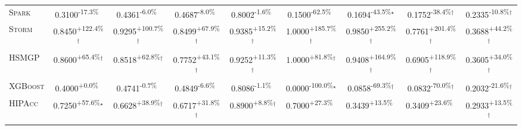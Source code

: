 \begin{table}[htbp]
\begin{tabular}{l|cccc|cccc}
\textsc{Spark} & \cellcolor{red!30}0.3100\textsuperscript{-17.3\%}$^{\,\,\,}$ & \cellcolor{red!30}0.4361\textsuperscript{-6.0\%}$^{\,\,\,}$ & \cellcolor{red!30}0.4687\textsuperscript{-8.0\%}$^{\,\,\,}$ & \cellcolor{red!30}0.8002\textsuperscript{-1.6\%}$^{\,\,\,}$ & \cellcolor{red!30}0.1500\textsuperscript{-62.5\%}$^{\,\,\,}$ & \cellcolor{red!30}0.1694\textsuperscript{-43.5\%}$^\star$ & \cellcolor{red!30}0.1752\textsuperscript{-38.4\%}$^\dagger$ & \cellcolor{red!30}0.2335\textsuperscript{-10.8\%}$^\dagger$ \\
\textsc{Storm} & \cellcolor{green!30}0.8450\textsuperscript{+122.4\%}$^\dagger$ & \cellcolor{green!30}0.9295\textsuperscript{+100.7\%}$^\dagger$ & \cellcolor{green!30}0.8499\textsuperscript{+67.9\%}$^\dagger$ & \cellcolor{green!30}0.9385\textsuperscript{+15.2\%}$^\dagger$ & \cellcolor{green!30}1.0000\textsuperscript{+185.7\%}$^\dagger$ & \cellcolor{green!30}0.9850\textsuperscript{+255.2\%}$^\dagger$ & \cellcolor{green!30}0.7761\textsuperscript{+201.4\%}$^\dagger$ & \cellcolor{green!30}0.3688\textsuperscript{+44.2\%}$^\dagger$ \\
\textsc{HSMGP} & \cellcolor{green!30}0.8600\textsuperscript{+65.4\%}$^\dagger$ & \cellcolor{green!30}0.8518\textsuperscript{+62.8\%}$^\dagger$ & \cellcolor{green!30}0.7752\textsuperscript{+43.1\%}$^\dagger$ & \cellcolor{green!30}0.9252\textsuperscript{+11.3\%}$^\dagger$ & \cellcolor{green!30}1.0000\textsuperscript{+81.8\%}$^\dagger$ & \cellcolor{green!30}0.9408\textsuperscript{+164.9\%}$^\dagger$ & \cellcolor{green!30}0.6905\textsuperscript{+118.9\%}$^\dagger$ & \cellcolor{green!30}0.3605\textsuperscript{+34.0\%}$^\dagger$ \\
\textsc{XGBoost} & \cellcolor{green!30}0.4000\textsuperscript{+0.0\%}$^{\,\,\,}$ & \cellcolor{red!30}0.4741\textsuperscript{-0.7\%}$^{\,\,\,}$ & \cellcolor{red!30}0.4849\textsuperscript{-6.6\%}$^{\,\,\,}$ & \cellcolor{red!30}0.8086\textsuperscript{-1.1\%}$^{\,\,\,}$ & \cellcolor{red!30}0.0000\textsuperscript{-100.0\%}$^\star$ & \cellcolor{red!30}0.0858\textsuperscript{-69.3\%}$^\dagger$ & \cellcolor{red!30}0.0832\textsuperscript{-70.0\%}$^\dagger$ & \cellcolor{red!30}0.2032\textsuperscript{-21.6\%}$^\dagger$ \\
\textsc{HIPAcc} & \cellcolor{green!30}0.7250\textsuperscript{+57.6\%}$^\star$ & \cellcolor{green!30}0.6628\textsuperscript{+38.9\%}$^\dagger$ & \cellcolor{green!30}0.6717\textsuperscript{+31.8\%}$^\dagger$ & \cellcolor{green!30}0.8900\textsuperscript{+8.8\%}$^\dagger$ & \cellcolor{green!30}0.7000\textsuperscript{+27.3\%}$^{\,\,\,}$ & \cellcolor{green!30}0.3439\textsuperscript{+13.5\%}$^{\,\,\,}$ & \cellcolor{green!30}0.3409\textsuperscript{+23.6\%}$^{\,\,\,}$ & \cellcolor{green!30}0.2933\textsuperscript{+13.5\%}$^\dagger$ \\

\end{tabular}
\end{table}

